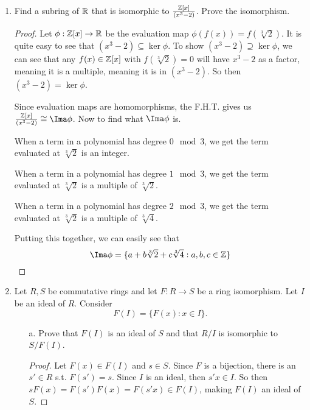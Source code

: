 \documentclass[12pt]{article}
\begin{document}
\begin{enumerate}
\begin{proof}
			Since evaluation maps are homomorphisms, and modulus is also a homomorphism, $\phi$ is a homomorphism. So the F.H.T. gives us $\frac{\Z[x]}{(2,x)} \cong \Ima\phi$. It is trivial to check that $\Ima\phi = \Z_2$ since there are only 2 elements.
			
			We know that any $\Z_q$ is a field as long as $q$ is a prime power. So then $\Z_2$ is a field. That implies that $\frac{\Z[x]}{(2,x)}$ is also a field, meaning $(2,x)$ is a maximal ideal.
		\end{proof}
		
		
		\item Find a subring of $\mathbb{R}$ that is isomorphic to $\frac{\mathbb{Z}[x]}{(x^3-2)}$. Prove the isomorphism.
		\begin{proof}
			Let $\phi:\mathbb{Z}[x] \rightarrow \mathbb{R}$ be the evaluation map $\phi(f(x)) = f(\sqrt[3]{2})$. It is quite easy to see that $(x^3-2) \subseteq \ker \phi$. To show $(x^3-2) \supseteq \ker \phi$, we can see that any $f(x) \in \mathbb{Z}[x]$ with $f(\sqrt[3]{2}) = 0$ will have $x^3-2$ as a factor, meaning it is a multiple, meaning it is in $(x^3-2)$. So then $(x^3-2) = \ker \phi$.
			
			Since evaluation maps are homomorphisms, the F.H.T. gives us $\frac{\Z[x]}{(x^3-2)} \cong \Ima\phi$. Now to find what $\Ima\phi$ is.
			
			When a term in a polynomial has degree $0 \mod 3$, we get the term evaluated at $\sqrt[3]{2}$ is an integer. 
			
			When a term in a polynomial has degree $1 \mod 3$, we get the term evaluated at $\sqrt[3]{2}$ is a multiple of $\sqrt[3]{2}$.
			
			When a term in a polynomial has degree $2 \mod 3$, we get the term evaluated at $\sqrt[3]{2}$ is a multiple of $\sqrt[3]{4}$.
			
			Putting this together, we can easily see that 
			\[\Ima\phi = \{a + b\sqrt[3]{2} + c\sqrt[3]{4} : a,b,c \in \Z\}\]
		\end{proof}
		
		 
		\item Let $R,S$ be commutative rings and let $F : R \rightarrow S$ be a ring isomorphism. Let $I$ be an ideal of $R$. Consider 
		\[F(I) = \{F(x) : x \in I\}.\]
		\begin{enumerate}
			\item[a.] Prove that $F(I)$ is an ideal of $S$ and that $R/I$ is isomorphic to $S/F(I)$.
			\begin{proof}
				Let $F(x) \in F(I)$ and $s \in S$. Since $F$ is a bijection, there is an $s' \in R$ s.t. $F(s') = s$. Since $I$ is an ideal, then $s'x \in I$. So then $sF(x) = F(s')F(x) = F(s'x) \in F(I)$, making $F(I)$ an ideal of $S$.
				

\end{proof}
\end{enumerate}
\end{enumerate}
\end{document}
